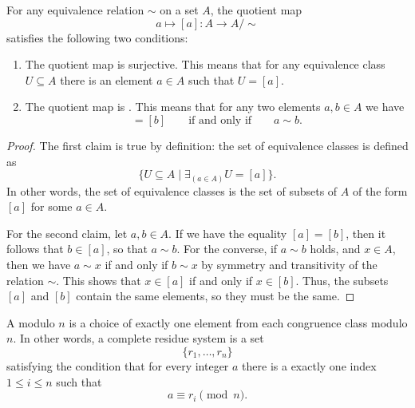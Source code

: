 \begin{proposition}\label{proposition:quotient-map}
  For any equivalence relation $\sim$ on a set $A$, the quotient map
  \begin{equation*}
    a\mapsto [a] : A \to A/{\sim}
  \end{equation*}
  satisfies the following two conditions:
  \begin{enumerate}
  \item The quotient map is surjective. This means that for any equivalence class $U\subseteq A$ there is an element $a\in A$ such that $U=[a]$.
  \item The quotient map is . This means that for any two elements $a,b\in A$ we have
    \begin{equation*}
      [a]=[b]\qquad\text{if and only if}\qquad a\sim b.
    \end{equation*}
  \end{enumerate}
\end{proposition}

\begin{proof}
  The first claim is true by definition: the set of equivalence classes is defined as
  \begin{equation*}
    \{U\subseteq A\mid \exists_{(a\in A)}U=[a]\}.
  \end{equation*}
  In other words, the set of equivalence classes is the set of subsets of $A$ of the form $[a]$ for some $a\in A$.

  For the second claim, let $a,b\in A$. If we have the equality $[a]=[b]$, then it follows that $b\in [a]$, so that $a\sim b$. For the converse, if $a\sim b$ holds, and $x\in A$, then we have $a\sim x$ if and only if $b\sim x$ by symmetry and transitivity of the relation $\sim$. This shows that $x\in [a]$ if and only if $x\in [b]$. Thus, the subsets $[a]$ and $[b]$ contain the same elements, so they must be the same.
\end{proof}

\begin{definition}
  A  modulo $n$ is a choice of exactly one element from each congruence class modulo $n$. In other words, a complete residue system is a set
\begin{equation*}
  \{r_1,\ldots,r_n\}
\end{equation*}
satisfying the condition that for every integer $a$ there is a exactly one index $1\leq i\leq n$ such that
\begin{equation*}
  a\equiv r_i \pmod{n}.
\end{equation*}
\end{definition}

